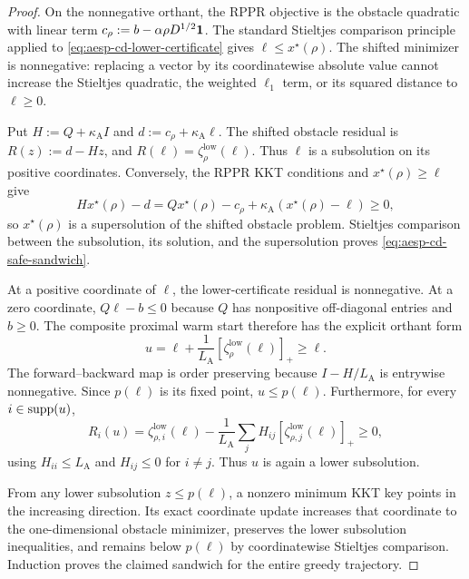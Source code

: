 \begin{proof}
On the nonnegative orthant, the RPPR objective is the obstacle quadratic with
linear term $c_\rho:=b-\alpha\rho D^{1/2}\mathbf{1}$.  The standard Stieltjes
comparison principle applied to
\cref{eq:aesp-cd-lower-certificate} gives $\ell\leq x^\star(\rho)$.
The shifted minimizer is nonnegative: replacing a vector by its coordinatewise
absolute value cannot increase the Stieltjes quadratic, the weighted
$\ell_1$ term, or its squared distance to $\ell\geq0$.

Put $H:=Q+\kappa_{\mathrm A}I$ and
$d:=c_\rho+\kappa_{\mathrm A}\ell$.  The shifted obstacle residual is
$R(z):=d-Hz$, and
$R(\ell)=\zeta_\rho^{\mathrm{low}}(\ell)$.  Thus $\ell$ is a subsolution on
its positive coordinates.  Conversely, the RPPR KKT conditions and
$x^\star(\rho)\geq\ell$ give
\begin{equation*}
 Hx^\star(\rho)-d
 =Qx^\star(\rho)-c_\rho
   +\kappa_{\mathrm A}(x^\star(\rho)-\ell)\geq0,
\end{equation*}
so $x^\star(\rho)$ is a supersolution of the shifted obstacle problem.
Stieltjes comparison between the subsolution, its solution, and the
supersolution proves \cref{eq:aesp-cd-safe-sandwich}.

At a positive coordinate of $\ell$, the lower-certificate residual is
nonnegative.  At a zero coordinate, $Q\ell-b\leq0$ because $Q$ has
nonpositive off-diagonal entries and $b\geq0$.  The composite proximal warm
start therefore has the explicit orthant form
\begin{equation*}
 u=\ell+\frac1{L_{\mathrm A}}
       [\zeta_\rho^{\mathrm{low}}(\ell)]_+\geq\ell.
\end{equation*}
The forward--backward map is order preserving because
$I-H/L_{\mathrm A}$ is entrywise nonnegative.  Since $p(\ell)$ is its fixed
point, $u\leq p(\ell)$.  Furthermore, for every $i\in\operatorname{supp}(u)$,
\begin{equation*}
 R_i(u)
 =\zeta_{\rho,i}^{\mathrm{low}}(\ell)
  -\frac1{L_{\mathrm A}}
    \sum_j H_{ij}[\zeta_{\rho,j}^{\mathrm{low}}(\ell)]_+
 \geq0,
\end{equation*}
using $H_{ii}\leq L_{\mathrm A}$ and $H_{ij}\leq0$ for $i\neq j$.
Thus $u$ is again a lower subsolution.

From any lower subsolution $z\leq p(\ell)$, a nonzero minimum KKT key points
in the increasing direction.  Its exact coordinate update increases that
coordinate to the one-dimensional obstacle minimizer, preserves the lower
subsolution inequalities, and remains below $p(\ell)$ by coordinatewise
Stieltjes comparison.  Induction proves the claimed sandwich for the entire
greedy trajectory.


\end{proof}
